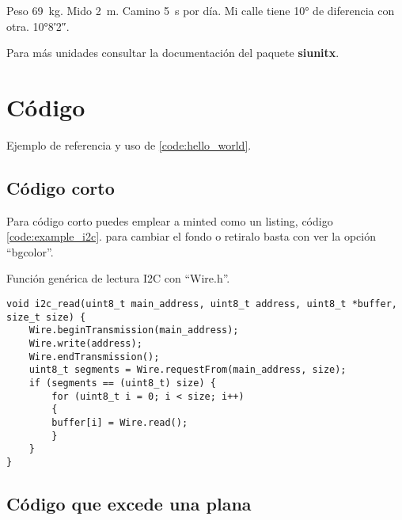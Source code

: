 Peso \si{69 \kilogram}.
Mido \si{2 \metre}.
Camino \si{5 \second} por día.
Mi calle tiene \ang{10} de diferencia con otra.
\ang{10;8;2}.

Para más unidades consultar la documentación del paquete 
\textbf{siunitx}.

\section{Código}
Ejemplo de referencia y uso de \ref{code:hello_world}.

\subsection{Código corto}
Para código corto puedes emplear a minted como un listing, código \ref{code:example_i2c}.
para cambiar el fondo o retiralo basta con ver la opción ``bgcolor''.

\begin{listing}[H]
    \caption{Función genérica de lectura I2C con ``Wire.h''.}
    \label{code:example_i2c}
    \begin{verbatim}
void i2c_read(uint8_t main_address, uint8_t address, uint8_t *buffer, size_t size) {
    Wire.beginTransmission(main_address);
    Wire.write(address);
    Wire.endTransmission();
    uint8_t segments = Wire.requestFrom(main_address, size);
    if (segments == (uint8_t) size) {
        for (uint8_t i = 0; i < size; i++)
        {
        buffer[i] = Wire.read();
        }  
    }
}
    \end{verbatim}
\end{listing}

\subsection{Código que excede una plana}

